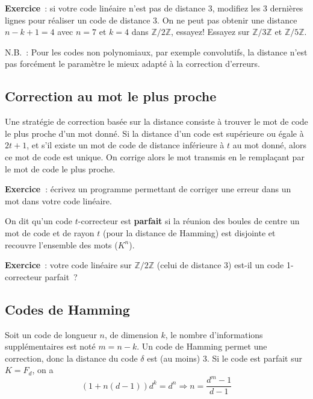 \documentclass[a4paper,11pt]{book}
\begin{document}
\begin{giacjshere}
{\bf Exercice}~: si votre code linéaire n'est pas de distance 3, modifiez
les 3 dernières lignes pour réaliser un code de distance 3. On
ne peut pas obtenir une distance $n-k+1=4$ avec $n=7$ et $k=4$ 
dans $\mathbb{Z}/2\mathbb{Z}$, essayez! Essayez sur $\mathbb{Z}/3\mathbb{Z}$ et $\mathbb{Z}/5\mathbb{Z}$.

N.B.~: Pour les codes non
polynomiaux, par exemple convolutifs, la distance n'est pas
forc\'ement le
param\`etre le mieux adapt\'e \`a la correction d'erreurs.

\subsection{Correction au mot le plus proche}
Une strat\'egie de correction bas\'ee sur la distance consiste \`a
trouver le mot de code le plus proche d'un mot donn\'e.
Si la distance d'un code est sup\'erieure ou \'egale
\`a $2t+1$, et s'il existe un mot de code de distance inf\'erieure
\`a $t$ au mot donn\'e, alors ce mot de code est unique.
On corrige alors le mot transmis en le remplaçant par le mot de code
le plus proche.

{\bf Exercice~}: écrivez un programme permettant de corriger une erreur
dans un mot dans votre code linéaire.

On dit qu'un code $t$-correcteur est 
{\bf parfait} si la réunion des boules
de centre un mot de code et de rayon $t$ (pour la distance de Hamming)
est disjointe et recouvre l'ensemble des mots ($K^n$).

{\bf Exercice}~: 
votre code linéaire sur $\mathbb{Z}/2\mathbb{Z}$ (celui de distance 3) 
est-il un code 1-correcteur parfait~?

\subsection{Codes de Hamming}
Soit un code de longueur $n$, de dimension $k$, le nombre
d'informations suppl\'ementaires est not\'e $m=n-k$. Un code
de Hamming 
permet une correction, donc la distance du code
$\delta$ est (au moins) 3. Si le code est parfait sur $K=F_d$, on a 
$$ (1+n(d-1))d^k=d^{n} \Rightarrow n=\frac{d^m-1}{d-1}$$


\end{giacjshere}
\end{document}
